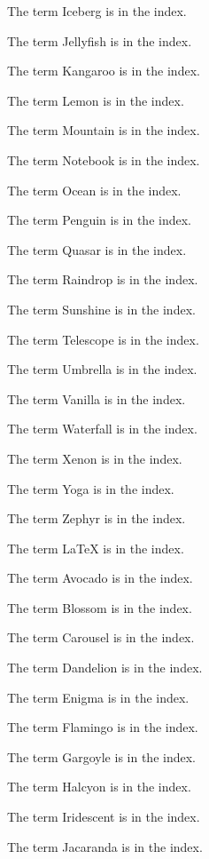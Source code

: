 The term Iceberg  is in the index.

The term Jellyfish  is in the index.

The term Kangaroo  is in the index.

The term Lemon  is in the index.

The term Mountain  is in the index.

The term Notebook  is in the index.

The term Ocean  is in the index.

The term Penguin  is in the index.

The term Quasar  is in the index.

The term Raindrop  is in the index.

The term Sunshine  is in the index.

The term Telescope  is in the index.

The term Umbrella  is in the index.

The term Vanilla  is in the index.

The term Waterfall  is in the index.

The term Xenon  is in the index.

The term Yoga  is in the index.

The term Zephyr  is in the index.

The term \LaTeX {} is in the index.

The term Avocado  is in the index.

The term Blossom  is in the index.

The term Carousel  is in the index.

The term Dandelion  is in the index.

The term Enigma  is in the index.

The term Flamingo  is in the index.

The term Gargoyle  is in the index.

The term Halcyon  is in the index.

The term Iridescent  is in the index.

The term Jacaranda  is in the index.

